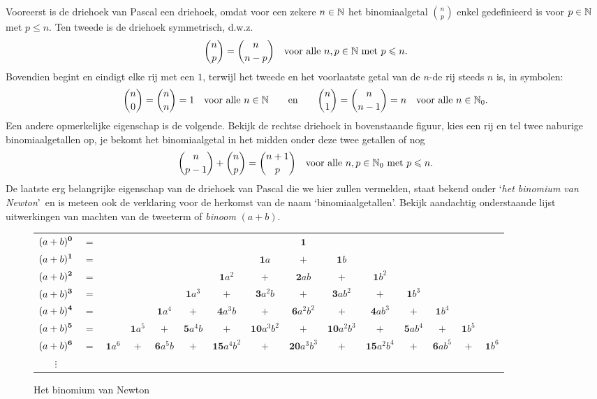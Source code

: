 \documentclass{ximera}
\begin{document}
Vooreerst is de driehoek van Pascal een driehoek, omdat voor een
zekere $n\in\mathbb{N}$ het binomiaalgetal ${n\choose p}$ enkel
gedefinieerd is voor $p\in\mathbb{N}$ met $p\leqslant n$. Ten tweede is de
driehoek symmetrisch, d.w.z. \[{n\choose p}={n\choose
n-p}\quad\textrm{voor alle}\ n,p\in\mathbb{N}\ \textrm{met}\ p\leqslant
n.\] Bovendien begint en eindigt elke rij met een $1$, terwijl het
tweede en het voorlaatste getal van de $n$-de rij steeds $n$ is,
in symbolen:
\[{n\choose 0}={n\choose
n}=1\quad\textrm{voor alle}\
n\in\mathbb{N}\qquad\textrm{en}\qquad{n\choose 1}={n\choose
n-1}=n\quad\textrm{voor alle}\ n\in\mathbb{N}_0.\] Een andere
opmerkelijke eigenschap is de volgende. Bekijk de rechtse driehoek
in bovenstaande figuur, kies een rij en tel twee naburige
binomiaalgetallen op, je bekomt het binomiaalgetal in het midden
onder deze twee getallen of nog \[{n\choose p-1}+{n\choose
p}={n+1\choose p}\quad\textrm{voor alle}\ n,p\in\mathbb{N}_0\
\textrm{met}\ p\leqslant n.\] De laatste erg belangrijke
eigenschap van de driehoek van Pascal die we hier zullen
vermelden, staat bekend onder \lq \emph{het binomium van
Newton}\rq\ en is meteen ook de verklaring voor de herkomst van de
naam \lq binomiaalgetallen\rq. Bekijk aandachtig onderstaande
lijst uitwerkingen van machten van de tweeterm of \emph{binoom}
$(a+b)$.

\begin{figure}[h]
\addtolength{\parindent}{-2.5cm}
\begin{tabular}{ccccccccccccccc}
$\displaystyle{(a+b)^{\mathbf{0}}}$&$=$&&&&&&& $\mathbf{1}$ &&&&& \\
$\displaystyle{(a+b)^{\mathbf{1}}}$&$=$&&&&&& $\mathbf{1}a$ &$+$& $\mathbf{1}b$ &&&&& \\
$\displaystyle{(a+b)^{\mathbf{2}}}$&$=$&&&&& $\mathbf{1}a^2$ &$+$& $\mathbf{2}ab$ &$+$& $\mathbf{1}b^2$ &&&& \\
$\displaystyle{(a+b)^{\mathbf{3}}}$&$=$&&&& $\mathbf{1}a^3$ &$+$& $\mathbf{3}a^2b$ &$+$& $\mathbf{3}ab^2$ &$+$& $\mathbf{1}b^3$ &&& \\
$\displaystyle{(a+b)^{\mathbf{4}}}$&$=$&&& $\mathbf{1}a^4$ &$+$& $\mathbf{4}a^3b$ &$+$& $\mathbf{6}a^2b^2$ &$+$& $\mathbf{4}ab^3$ &$+$& $\mathbf{1}b^4$ && \\
$\displaystyle{(a+b)^{\mathbf{5}}}$&$=$&& $\mathbf{1}a^5$ &$+$& $\mathbf{5}a^4b$ &$+$& $\mathbf{10}a^3b^2$ &$+$& $\mathbf{10}a^2b^3$ &$+$& $\mathbf{5}ab^4$  &$+$& $\mathbf{1}b^5$ & \\
$\displaystyle{(a+b)^{\mathbf{6}}}$&$=$&$\mathbf{1}a^6$ &$+$& $\mathbf{6}a^5b$ &$+$& $\mathbf{15}a^4b^2$ &$+$& $\mathbf{20}a^3b^3$ &$+$& $\mathbf{15}a^2b^4$ &$+$& $\mathbf{6}ab^5$ &$+$& $\mathbf{1}b^6$ \\
$\vdots$&&&&&&&&&&&&&&
\end{tabular}
\addtolength{\parindent}{+2.5cm} \caption{Het binomium van
Newton}\label{M02_figuurbinomium}
\end{figure}
\end{document}
